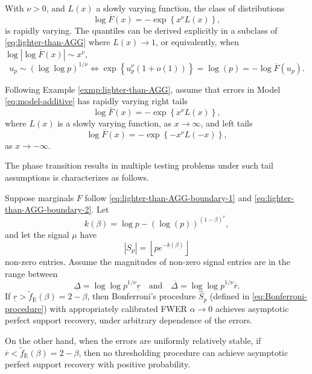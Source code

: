 \begin{example} \label{exmp:lighter-than-AGG}
With $\nu>0$, and $L(x)$ a slowly varying function, the class of distributions
\begin{equation} \label{eq:lighter-than-AGG}
    \log{\overline{F}(x)} = - \exp{\left\{x^\nu L(x)\right\}},
\end{equation}
is rapidly varying.
The quantiles can be derived explicitly in a subclass of \eqref{eq:lighter-than-AGG} where $L(x)\to 1$, or equivalently, when $\log{|\log{\overline{F}(x)}|}\sim x^\nu$,
\begin{equation*}
    u_p \sim \left(\log \log{p}\right)^{1/\nu}
    \iff \exp{\left\{u_p^\nu\left(1+o(1)\right)\right\}} = \log(p) = - \log \overline{F}(u_p).
\end{equation*}
\end{example}


Following Example \ref{exmp:lighter-than-AGG}, assume that errors in Model \eqref{eq:model-additive} has rapidly varying right tails
\begin{equation} \label{eq:lighter-than-AGG-boundary-1}
        \log{\overline{F}(x)} = - \exp{\left\{x^\nu L(x)\right\}},
\end{equation}
where $L(x)$ is a slowly varying function, as $x\to\infty$, and left tails
\begin{equation} \label{eq:lighter-than-AGG-boundary-2}
        \log{\overline{F}(x)} = - \exp{\left\{-x^\nu L(-x)\right\}},
\end{equation}
as $x\to -\infty$.

The phase transition results in multiple testing problems under such tail assumptions is characterizes as follows.

\begin{theorem} \label{thm:lighter-than-AGG}
Suppose marginals $F$ follow \eqref{eq:lighter-than-AGG-boundary-1} and \eqref{eq:lighter-than-AGG-boundary-2}.
Let
$$
k(\beta) = \log{p} - \left(\log(p)\right)^{(1-\beta)^\nu},
$$
and let the signal $\mu$ have 
$$|S_p| = \left\lfloor pe^{-k(\beta)} \right\rfloor$$
non-zero entries. Assume the magnitudes of non-zero signal entries are in the range between
$$\underline{\Delta} = \log{\log{p}}^{1/\nu}\underline{r}
\quad\text{and}\quad
\overline{\Delta} = \log{\log{p}}^{1/\nu}\overline{r}.$$
If $\underline{r} > \widetilde{f}_{\mathrm{E}}(\beta) = 2 - \beta$, then Bonferroni's procedure $\widehat{S}_p$ (defined in \eqref{eq:Bonferroni-procedure}) with appropriately calibrated FWER $\alpha\to 0$ achieves asymptotic perfect support recovery, under arbitrary dependence of the errors.

On the other hand, when the errors are uniformly relatively stable, if $\overline{r} < \widetilde{f}_{\mathrm{E}}(\beta) = 2 - \beta$, then no thresholding procedure can achieve asymptotic perfect support recovery with positive probability.
\end{theorem}


